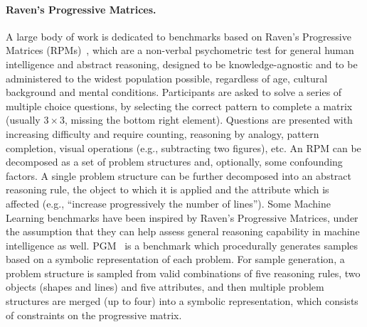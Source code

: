 \paragraph{Raven's Progressive Matrices.}
A large body of work is dedicated to benchmarks based on Raven's Progressive Matrices (RPMs)~\cite{raven1938raven}, which are a non-verbal psychometric test for general human intelligence and abstract reasoning, designed to be knowledge-agnostic and to be administered to the widest population possible, regardless of age, cultural background and mental conditions.
Participants are asked to solve a series of multiple choice questions, by selecting the correct pattern to complete a matrix (usually $3\times3$, missing the bottom right element).
Questions are presented with increasing difficulty and require counting, reasoning by analogy, pattern completion, visual operations (e.g., subtracting two figures), etc.
An RPM can be decomposed as a set of problem structures and, optionally, some confounding factors.
A single problem structure can be further decomposed into an abstract reasoning rule, the object to which it is applied and the attribute which is affected (e.g., ``increase progressively the number of lines'').
Some Machine Learning benchmarks have been inspired by Raven's Progressive Matrices, under the assumption that they can help assess general reasoning capability in machine intelligence as well.
PGM~\cite{barrett2018measuring} is a benchmark %
which procedurally generates samples based on a symbolic representation of each problem.
For sample generation, a problem structure is sampled from valid combinations of five reasoning rules, two objects (shapes and lines) and five attributes, and then multiple problem structures are merged (up to four) into a symbolic representation, which consists of constraints on the progressive matrix.
